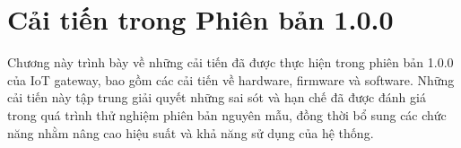 \chapter{Cải tiến trong Phiên bản 1.0.0}
    Chương này trình bày về những cải tiến đã được thực hiện trong phiên bản 1.0.0 của IoT gateway, bao gồm các cải tiến về hardware, firmware và software. Những cải tiến này tập trung giải quyết những sai sót và hạn chế đã được đánh giá trong quá trình thử nghiệm phiên bản nguyên mẫu, đồng thời bổ sung các chức năng nhằm nâng cao hiệu suất và khả năng sử dụng của hệ thống.
    
    
    
